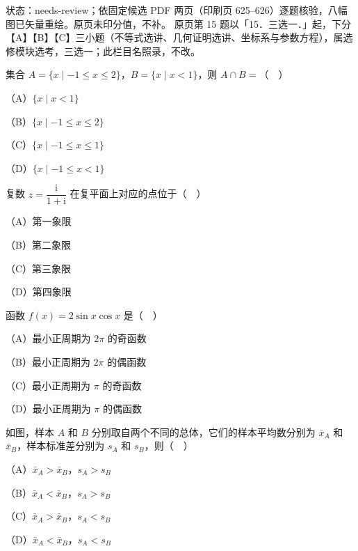 状态：needs-review；依固定候选 PDF 两页（印刷页 625–626）逐题核验，八幅图已矢量重绘。原页未印分值，不补。
原页第 15 题以「15．三选一．」起，下分【A】【B】【C】三小题（不等式选讲、几何证明选讲、坐标系与参数方程），属选修模块选考，三选一；此栏目名照录，不改。
\begin{question}
集合 $A=\{x\mid -1\leqslant x\leqslant 2\}$，$B=\{x\mid x<1\}$，则 $A\cap B=$（　）

（A）$\{x\mid x<1\}$

（B）$\{x\mid -1\leqslant x\leqslant 2\}$

（C）$\{x\mid -1\leqslant x\leqslant 1\}$

（D）$\{x\mid -1\leqslant x<1\}$

\end{question}
\begin{question}
复数 $z=\dfrac{\mathrm i}{1+\mathrm i}$ 在复平面上对应的点位于（　）

（A）第一象限

（B）第二象限

（C）第三象限

（D）第四象限

\end{question}
\begin{question}
函数 $f(x)=2\sin x\cos x$ 是（　）

（A）最小正周期为 $2\pi$ 的奇函数

（B）最小正周期为 $2\pi$ 的偶函数

（C）最小正周期为 $\pi$ 的奇函数

（D）最小正周期为 $\pi$ 的偶函数

\Needspace{0.4\textheight}
\end{question}
\begingroup
\renewenvironment{question}{\Needspace{0.5\textheight}}{}
\begin{question}
如图，样本 $A$ 和 $B$ 分别取自两个不同的总体，它们的样本平均数分别为 $\bar x_A$ 和 $\bar x_B$，样本标准差分别为 $s_A$ 和 $s_B$，则（　）

（A）$\bar x_A>\bar x_B$，$s_A>s_B$

（B）$\bar x_A<\bar x_B$，$s_A>s_B$

（C）$\bar x_A>\bar x_B$，$s_A<s_B$

（D）$\bar x_A<\bar x_B$，$s_A<s_B$
\nopagebreak[4]
\begin{center}\end{center}
\nopagebreak[4]
\Needspace{0.4\textheight}
\end{question}
